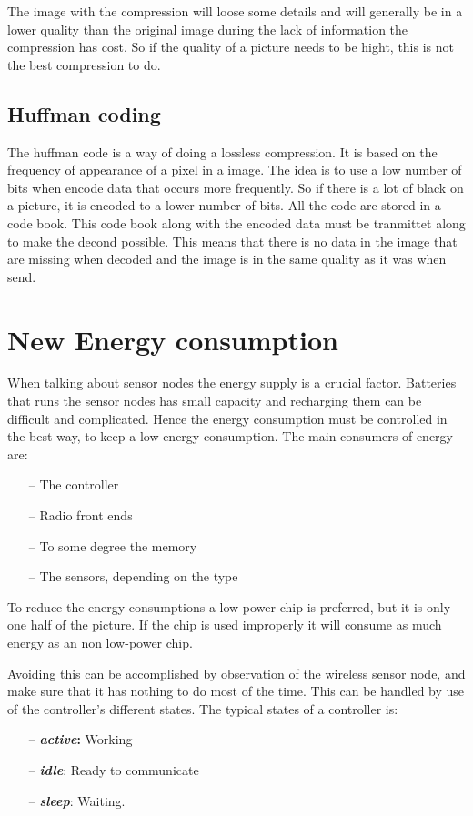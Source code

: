 The image with the compression will loose some details and will generally be in a lower quality than the original image during the lack of information the compression has cost. So if the quality of a picture needs to be hight, this is not the best compression to do.  

\subsection{Huffman coding}
The huffman code is a way of doing a lossless compression. It is based on the frequency of appearance of a pixel in a image. The idea is to use a low number of bits when encode data that occurs more frequently. So if there is a lot of black on a picture, it is encoded to a lower number of bits. All the code are stored in a code book. This code book along with the encoded data must be tranmittet along to make the decond possible. This means that there is no data in the image that are missing when decoded and the image is in the same quality as it was when send.

\section{New Energy consumption}
When talking about sensor nodes the energy supply is a crucial factor. Batteries that runs the sensor nodes has small capacity and recharging them can be difficult and complicated. Hence the energy consumption must be controlled in the best way, to keep a low energy consumption.
The main consumers of energy are:
\begin{itemize}
	\item[--] The controller
	\item[--] Radio front ends
	\item[--] To some degree the memory
	\item[--] The sensors, depending on the type
\end{itemize}
	 
To reduce the energy consumptions a low-power chip is preferred, but it is only one half of the picture. If the chip is used improperly it will consume as much energy as an non low-power chip.

Avoiding this can be accomplished by observation of the wireless sensor node, and make sure that it has nothing to do most of the time. This can be handled by use of the controller's different states. The typical states of a controller is:
\begin{itemize}
	\item[--] \textbf{\emph{active}:} Working 
	\item[--] \textbf{\emph{idle}}: Ready to communicate 
	\item[--] \textbf{\emph{sleep}}: Waiting.
\end{itemize}

